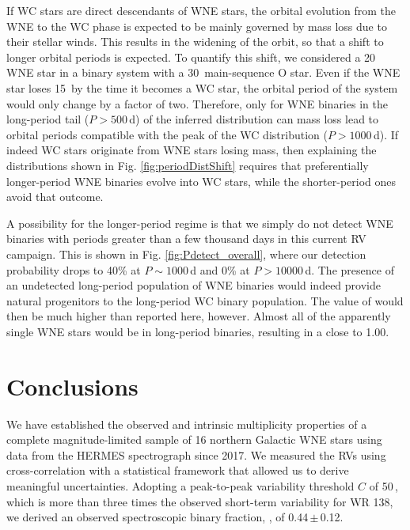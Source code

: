 If WC stars are direct descendants of WNE stars, the orbital evolution from the WNE to the WC phase is expected to be mainly governed by mass loss due to their stellar winds. This results in the widening of the orbit, so that a shift to longer orbital periods is expected. To quantify this shift, we considered a 20\,\Msun{} WNE star in a binary system with a 30\,\Msun{} main-sequence O star. Even if the WNE star loses 15\,\Msun{} by the time it becomes a WC star, the orbital period of the system would only change by a factor of two. Therefore, only for WNE binaries in the long-period tail ($P>500$\,d) of the inferred distribution can mass loss lead to orbital periods compatible with the peak of the WC distribution ($P>1000$\,d). If indeed WC stars originate from WNE stars losing mass, then explaining the distributions shown in Fig. \ref{fig:periodDistShift} requires that preferentially longer-period WNE binaries evolve into WC stars, while the shorter-period ones avoid that outcome.

A possibility for the longer-period regime is that we simply do not detect WNE binaries with periods greater than a few thousand days in this current RV campaign. This is shown in Fig. \ref{fig:Pdetect_overall}, where our detection probability drops to 40\% at $P\sim1000$\,d and 0\% at $P>10000$\,d. The presence of an undetected long-period population of WNE binaries would indeed provide natural progenitors to the long-period WC binary population. The value of \fintWNE{} would then be much higher than reported here, however. Almost all of the apparently single WNE stars would be in long-period binaries, resulting in a \fintWNE{} close to 1.00.

\section{Conclusions}\label{sect:conclusions_WNE}
We have established the observed and intrinsic multiplicity properties of a complete magnitude-limited sample of 16 northern Galactic WNE stars using data from the HERMES spectrograph since 2017. We measured the RVs using cross-correlation with a statistical framework that allowed us to derive meaningful uncertainties. Adopting a peak-to-peak variability threshold $C$ of 50\,\kms{}, which is more than three times the observed short-term variability for WR 138, we derived an observed spectroscopic binary fraction, \fobsWNE{}, of 0.44\,$\pm$\,0.12.

